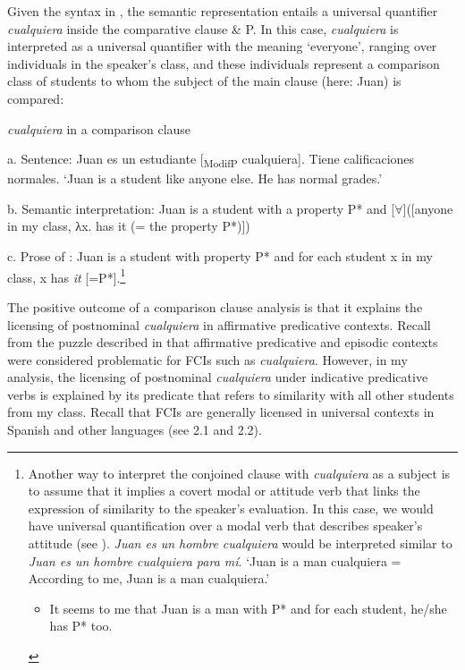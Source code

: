   Given the syntax in , the semantic representation entails a universal quantifier \textit{cualquiera} inside the comparative clause \& P. In this case, \textit{cualquiera} is interpreted as a universal quantifier with the meaning ‘everyone’, ranging over individuals in the speaker’s class, and these individuals represent a comparison class of students to whom the subject of the main clause (here: Juan) is compared:

\label{bkm:Ref54682554}  \textit{cualquiera} in a comparison clause

  a.  Sentence: Juan es un estudiante [\textsubscript{ModifP} cualquiera]. Tiene calificaciones normales. ‘Juan is a student like anyone else. He has normal grades.’

  b.  Semantic interpretation: Juan is a student with a property P* and [${\forall}$]([anyone in my class, λx. has it (= the property P*)])

  c.  Prose of : Juan is a student with property P* and for each student x in my class, x has \textit{it} [=P*].\footnote{{Another way to interpret the conjoined clause with} {\textit{cualquiera}} {as a subject is to assume that it implies a covert modal or attitude verb that links the expression of similarity to the speaker’s evaluation. In this case, we would have universal quantification over a modal verb that describes speaker’s attitude (see ).} {\textit{Juan es un hombre cualquiera}} {would be interpreted similar to} {\textit{Juan es un hombre cualquiera para mí}}{. ‘Juan is a man cualquiera = According to me, Juan is a man cualquiera.’}

\begin{itemize}
\item
{It seems to me that Juan is a man with P* and for each student, he/she has P* too.}
\end{itemize}
}

The positive outcome of a comparison clause analysis is that it explains the licensing of postnominal \textit{cualquiera} in affirmative predicative contexts. Recall from the puzzle described in  that affirmative predicative and episodic contexts were considered problematic for FCIs such as \textit{cualquiera}. However, in my analysis, the licensing of postnominal \textit{cualquiera} under indicative predicative verbs is explained by its predicate that refers to similarity with all other students from my class. Recall that FCIs are generally licensed in universal contexts in Spanish and other languages (see 2.1 and 2.2).

